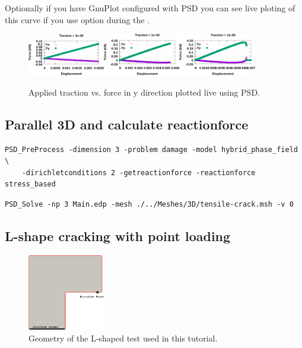 Optionally if you have GnuPlot configured with PSD you can see live ploting of this curve if you use option   during the  . 

\begin{figure}[h!]
	\centering
	
	\includegraphics[width=0.3\textwidth]{./Images/gp0.png}\includegraphics[width=0.3\textwidth]{./Images/gp1.png}\includegraphics[width=0.3\textwidth]{./Images/gp2.png}
	\caption{Applied traction vs. force in y direction plotted live using PSD. \label{gnuplot-plot}}
\end{figure}



\subsection{Parallel 3D and calculate reactionforce}


\begin{lstlisting}[style=BashInputStyle]
	PSD_PreProcess -dimension 3 -problem damage -model hybrid_phase_field \
	-dirichletconditions 2 -getreactionforce -reactionforce stress_based
\end{lstlisting}

\begin{lstlisting}[style=BashInputStyle]
	PSD_Solve -np 3 Main.edp -mesh ./../Meshes/3D/tensile-crack.msh -v 0
\end{lstlisting}



\subsection{L-shape cracking with point loading}
\begin{figure}[h!]
	\centering
	\includegraphics[width=0.3\textwidth]{./Images/fm-geometry.png}
	\caption{Geometry of the L-shaped test used in this tutorial. \label{L-shape-geo}}
\end{figure}

